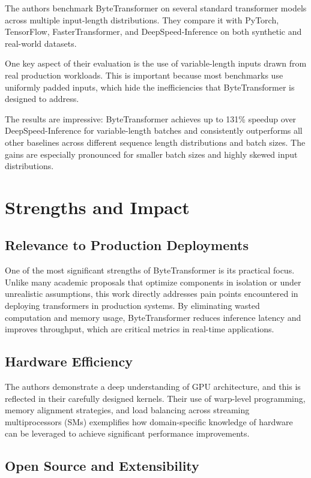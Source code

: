 \documentclass[11pt]{article}
\begin{document}
The authors benchmark ByteTransformer on several standard transformer models across multiple input-length distributions. They compare it with PyTorch, TensorFlow, FasterTransformer, and DeepSpeed-Inference on both synthetic and real-world datasets.

One key aspect of their evaluation is the use of variable-length inputs drawn from real production workloads. This is important because most benchmarks use uniformly padded inputs, which hide the inefficiencies that ByteTransformer is designed to address.

The results are impressive: ByteTransformer achieves up to 131\% speedup over DeepSpeed-Inference for variable-length batches and consistently outperforms all other baselines across different sequence length distributions and batch sizes. The gains are especially pronounced for smaller batch sizes and highly skewed input distributions.

\section{Strengths and Impact}

\subsection{Relevance to Production Deployments}

One of the most significant strengths of ByteTransformer is its practical focus. Unlike many academic proposals that optimize components in isolation or under unrealistic assumptions, this work directly addresses pain points encountered in deploying transformers in production systems. By eliminating wasted computation and memory usage, ByteTransformer reduces inference latency and improves throughput, which are critical metrics in real-time applications.

\subsection{Hardware Efficiency}

The authors demonstrate a deep understanding of GPU architecture, and this is reflected in their carefully designed kernels. Their use of warp-level programming, memory alignment strategies, and load balancing across streaming multiprocessors (SMs) exemplifies how domain-specific knowledge of hardware can be leveraged to achieve significant performance improvements.

\subsection{Open Source and Extensibility}
\end{document}
